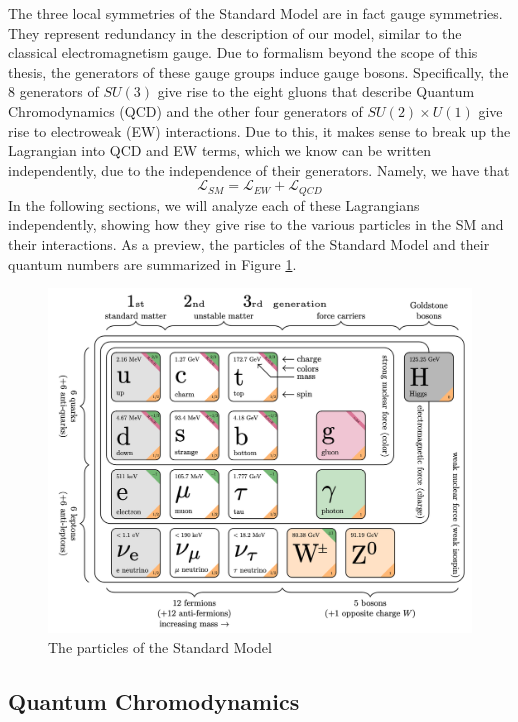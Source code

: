 The three local symmetries of the Standard Model are in fact gauge symmetries. They represent redundancy in the description of our model, similar to the classical electromagnetism gauge. Due to formalism beyond the scope of this thesis, the generators of these gauge groups induce gauge bosons. Specifically, the 8 generators of $SU(3)$ give rise to the eight gluons that describe Quantum Chromodynamics (QCD) and the other four generators of $SU(2) \times U(1)$ give rise to electroweak (EW) interactions. Due to this, it makes sense to break up the Lagrangian into QCD and EW terms, which we know can be written independently, due to the independence of their generators. Namely, we have that
\begin{equation}
\mathcal{L}_{SM} = \mathcal{L}_{EW} + \mathcal{L}_{QCD}
\end{equation}
In the following sections, we will analyze each of these Lagrangians independently, showing how they give rise to the various particles in the SM and their interactions. As a preview, the particles of the Standard Model and their quantum numbers are summarized in Figure \ref{fig:particles_of_the_SM}. 

\begin{figure}[ht!]
    \centering
    \includegraphics[width=1.0\textwidth]{figures/chapter2/particles_of_the_SM.png}
    \caption{The particles of the Standard Model}
    \label{fig:particles_of_the_SM}
\end{figure}

\subsection{Quantum Chromodynamics}

